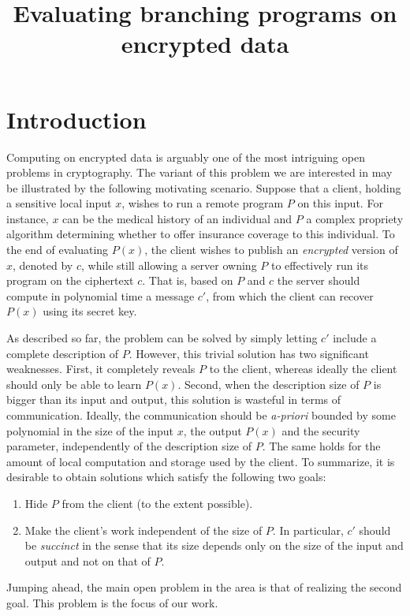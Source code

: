 \documentclass{article}
\title{Evaluating branching programs on encrypted data}\label{sec-eval-bp}
\begin{document}
	\maketitle
\section{Introduction}
Computing on encrypted data is arguably one of the most intriguing
open problems in cryptography. The variant of this problem we are
interested in may be illustrated by the following motivating
scenario. Suppose that a client, holding a sensitive local input
$x$, wishes to run a remote program $P$ on this input. For
instance, $x$ can be the medical history of an individual and $P$ a
complex propriety algorithm determining whether to offer insurance
coverage to this individual. To the end of evaluating $P(x)$, the
client wishes to publish an {\em encrypted} version of $x$, denoted
by $c$, while still allowing a server owning $P$ to effectively run
its program on the ciphertext $c$. That is, based on $P$ and $c$
the server should compute in polynomial time a message $c'$, from
which the client can recover $P(x)$ using its secret key.


As described so far, the problem can be solved by simply letting
$c'$ include a complete description of $P$. However, this trivial
solution has two significant weaknesses. First, it completely
reveals $P$ to the client, whereas ideally the client should only
be able to learn $P(x)$. Second, when the description size of $P$
is bigger than its input and output, this solution is wasteful in
terms of communication. Ideally, the communication should be {\em
a-priori} bounded by some polynomial in the size of the input $x$,
the output $P(x)$ and the security parameter, independently of the
description size of $P$.  The same holds for the amount of local
computation and storage used by the client. To summarize, it is
desirable to obtain solutions which satisfy the following two
goals:
\begin{enumerate}
\item Hide $P$ from the client (to the extent possible).

\item Make the client's work independent of the size of $P$. In
particular, $c'$ should be {\em succinct} in the sense that its
size depends only on the size of the input and output and not
on that of $P$.
\end{enumerate}
Jumping ahead, the main open problem in the area is that of
realizing the second goal. This problem is the focus of our
work.
\end{document}

